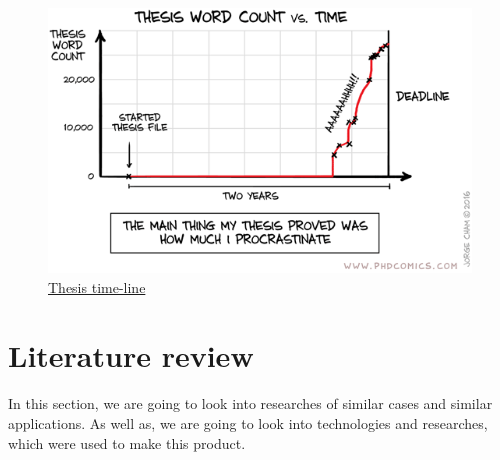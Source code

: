 \begin{figure}[H]
    \centering
    \includegraphics[scale=0.9]{Figures/thesis-word-count.png}
    \caption[thesis-word-count]{\href{http://phdcomics.com/comics/archive_print.php?comicid=1915}{Thesis time-line}}
    \label{fig:thesis-word-count.png}
\end{figure}

\section{Literature review}
\pad In this section, we are going to look into researches of similar cases and similar applications. As well as, we are going to look into technologies and researches, which were used to make this product. 


\subsection{}


\par 

\par 

\par 

\par 

